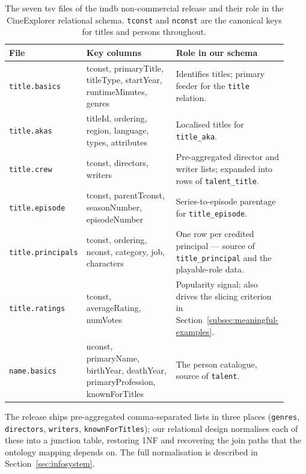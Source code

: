 \begin{table}[H]
\centering
\small
\begin{tabular}{p{0.20\linewidth} p{0.32\linewidth} p{0.40\linewidth}}
\hline
\textbf{File} & \textbf{Key columns} & \textbf{Role in our schema} \\
\hline
\texttt{title.basics}     & tconst, primaryTitle, titleType, startYear, runtimeMinutes, genres & Identifies titles; primary feeder for the \texttt{title} relation. \\
\texttt{title.akas}       & titleId, ordering, region, language, types, attributes             & Localised titles for \texttt{title\_aka}. \\
\texttt{title.crew}       & tconst, directors, writers                                         & Pre-aggregated director and writer lists; expanded into rows of \texttt{talent\_title}. \\
\texttt{title.episode}    & tconst, parentTconst, seasonNumber, episodeNumber                  & Series-to-episode parentage for \texttt{title\_episode}. \\
\texttt{title.principals} & tconst, ordering, nconst, category, job, characters                & One row per credited principal — source of \texttt{title\_principal} and the playable-role data. \\
\texttt{title.ratings}    & tconst, averageRating, numVotes                                    & Popularity signal; also drives the slicing criterion in Section~\ref{subsec:meaningful-examples}. \\
\texttt{name.basics}      & nconst, primaryName, birthYear, deathYear, primaryProfession, knownForTitles & The person catalogue, source of \texttt{talent}. \\
\hline
\end{tabular}
\caption{The seven \ac{tsv} files of the \ac{imdb} non-commercial release and their role in the CineExplorer relational schema. \texttt{tconst} and \texttt{nconst} are the canonical keys for titles and persons throughout.}
\label{tab:imdb-files}
\end{table}

The release ships pre-aggregated comma-separated lists in three places (\texttt{genres}, \texttt{directors}, \texttt{writers}, \texttt{knownForTitles}); our relational design normalises each of these into a junction table, restoring 1NF and recovering the join paths that the ontology mapping depends on. The full normalisation is described in Section~\ref{sec:infosystem}.

